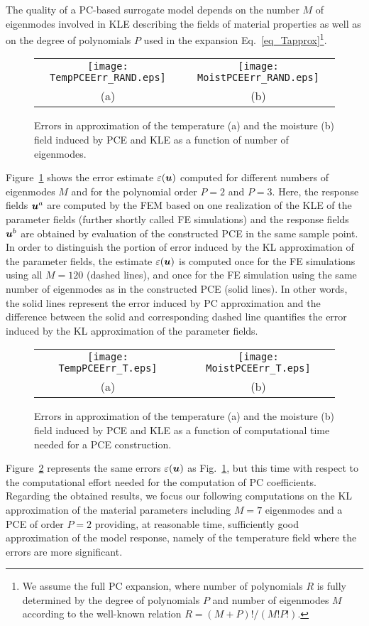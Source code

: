 \documentclass[preprint,12pt]{elsarticle}
\newcommand{\vek}[1]{\mathchoice{\displaystyle\boldsymbol#1}
{\textstyle\boldsymbol#1}{\scriptstyle\boldsymbol#1}
{\scriptscriptstyle\boldsymbol#1}}
\begin{document}
The quality of a PC-based surrogate model depends on the number
$M$ of eigenmodes involved in KLE describing the fields of
material properties as well as on the degree of polynomials $P$
used in the expansion Eq.~\eqref{eq_Tapprox}\footnote{We assume
the full PC expansion,
  where number of polynomials $R$ is fully determined by the degree of
  polynomials $P$ and number of eigenmodes $M$ according to the
  well-known relation $R = (M+P)!/(M!P!)$.}.
\begin{figure} [ht!]
\centering
\begin{tabular}{cc}
\texttt{[image: TempPCEErr\_RAND.eps]}&
\texttt{[image: MoistPCEErr\_RAND.eps]}\\
(a)&(b)
\end{tabular}
\caption{ Errors in approximation of the temperature (a) and the
  moisture (b) field induced by PCE and KLE as a function of number of
  eigenmodes.}
\label{fig_wholeerr}
\end{figure}
Figure~\ref{fig_wholeerr} shows the error estimate
$\varepsilon(\vek{u})$ computed for different numbers of
eigenmodes $M$ and for the polynomial order $P=2$ and $P=3$. Here,
the response fields $\vek{u}^a$ are
  computed by the FEM based on one realization of the KLE of the
  parameter fields (further shortly called FE simulations) and the
  response fields $\vek{u}^b$ are obtained by evaluation of the
  constructed PCE in the same sample point. In order to distinguish
  the portion of error induced by the KL approximation of the parameter
  fields, the estimate $\varepsilon(\vek{u})$ is computed once for the FE
  simulations using all $M=120$ (dashed lines), and once for the FE
  simulation using the same number of eigenmodes as in the constructed
  PCE (solid lines). In other words, the solid lines represent the
error induced by PC approximation and the difference between the
solid and corresponding dashed line quantifies the error induced
by the KL approximation of the parameter fields.

\begin{figure} [ht!]
\centering
\begin{tabular}{cc}
\texttt{[image: TempPCEErr\_T.eps]}&
\texttt{[image: MoistPCEErr\_T.eps]}\\
(a)&(b)
\end{tabular}
\caption{ Errors in approximation of the temperature (a) and the
  moisture (b) field induced by PCE and KLE as a function of
  computational time needed for a PCE construction.}
\label{fig_wholeerr_time}
\end{figure}
Figure~\ref{fig_wholeerr_time} represents the same errors
$\varepsilon(\vek{u})$ as Fig.~\ref{fig_wholeerr}, but this time
with respect to the computational effort needed for the
computation of PC coefficients. Regarding the obtained results, we
focus our following computations on the KL approximation of the
material parameters including $M=7$ eigenmodes and a PCE of order
$P=2$ providing, at reasonable time, sufficiently good
approximation of the model response, namely of the temperature
field where the errors are more significant.
\end{document}
